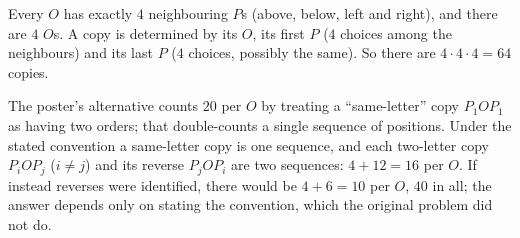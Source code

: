 Every $O$ has exactly $4$ neighbouring $P$s (above, below, left and right), and there are $4$ $O$s. A copy is determined by its $O$, its first $P$ ($4$ choices among the neighbours) and its last $P$ ($4$ choices, possibly the same). So there are $4\cdot4\cdot4=\boxed{64}$ copies.

The poster's alternative counts $20$ per $O$ by treating a ``same-letter'' copy $P_1OP_1$ as having two orders; that double-counts a single sequence of positions. Under the stated convention a same-letter copy is one sequence, and each two-letter copy $P_iOP_j$ ($i\ne j$) and its reverse $P_jOP_i$ are two sequences: $4+12=16$ per $O$. If instead reverses were identified, there would be $4+6=10$ per $O$, $40$ in all; the answer depends only on stating the convention, which the original problem did not do.
